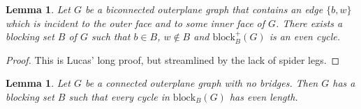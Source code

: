 \documentclass{patmorin}
\newcommand{\block}{\mathrm{block}}
\newtheorem{lemma}[theorem]{Lemma}
\begin{document}
\begin{lemma}
 Let $G$ be a biconnected outerplane graph that contains an edge $\{b,w\}$ which is incident to the outer face and to some inner face of $G$. There exists a blocking set $B$ of $G$ such that $b \in B$, $w \notin B$ and $\block_{B}^+(G)$ is an even cycle.
 \label{lem:biconnected_even}
\end{lemma}

\begin{proof}
This is Lucas' long proof, but streamlined by the lack of spider legs.
\end{proof}

%
%

\begin{lemma}
 Let $G$ be a connected outerplane graph with no bridges.  
 Then $G$ has a blocking set $B$ such that
 every cycle in $\block_B(G)$ has even length.
 \label{lem:outerplanar_even}
\end{lemma}
\end{document}
